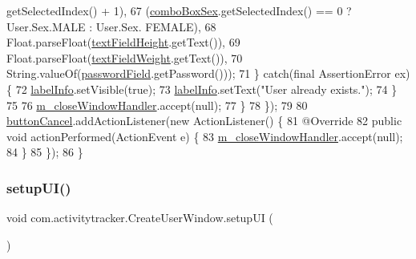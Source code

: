 \begin{DoxyCode}
      getSelectedIndex() + 1),
67                             (\mbox{\hyperlink{classcom_1_1activitytracker_1_1_create_user_window_a62e1c71627dc29c17bdffe73794f91f7}{comboBoxSex}}.getSelectedIndex() == 0 ? User.Sex.MALE : User.Sex.
      FEMALE),
68                             Float.parseFloat(\mbox{\hyperlink{classcom_1_1activitytracker_1_1_create_user_window_ac5ce2bc2efbc06d578d93fb3f26aad1c}{textFieldHeight}}.getText()),
69                             Float.parseFloat(\mbox{\hyperlink{classcom_1_1activitytracker_1_1_create_user_window_ae84b4d977150419bfabc11fbd009392c}{textFieldWeight}}.getText()),
70                             String.valueOf(\mbox{\hyperlink{classcom_1_1activitytracker_1_1_create_user_window_a29be9c267c003ae90731199d8257dc0a}{passwordField}}.getPassword()));
71                 \} \textcolor{keywordflow}{catch}(\textcolor{keyword}{final} AssertionError ex) \{
72                     \mbox{\hyperlink{classcom_1_1activitytracker_1_1_create_user_window_a09fb943f56852bc4a8dbd32b7dbe8afc}{labelInfo}}.setVisible(\textcolor{keyword}{true});
73                     \mbox{\hyperlink{classcom_1_1activitytracker_1_1_create_user_window_a09fb943f56852bc4a8dbd32b7dbe8afc}{labelInfo}}.setText(\textcolor{stringliteral}{"User already exists."});
74                 \}
75 
76                 \mbox{\hyperlink{classcom_1_1activitytracker_1_1_create_user_window_a8fd1d7fb3c2f1913d2c44fd1d475a20a}{m\_closeWindowHandler}}.accept(null);
77             \}
78         \});
79 
80         \mbox{\hyperlink{classcom_1_1activitytracker_1_1_create_user_window_a975a5cc35d145a3efa4d9e340776ca63}{buttonCancel}}.addActionListener(\textcolor{keyword}{new} ActionListener() \{
81             @Override
82             \textcolor{keyword}{public} \textcolor{keywordtype}{void} actionPerformed(ActionEvent e) \{
83                 \mbox{\hyperlink{classcom_1_1activitytracker_1_1_create_user_window_a8fd1d7fb3c2f1913d2c44fd1d475a20a}{m\_closeWindowHandler}}.accept(null);
84             \}
85         \});
86     \}
\end{DoxyCode}
\mbox{\label{classcom_1_1activitytracker_1_1_create_user_window_a41715d85194c6bb84cf6969f771940dc}} 
\subsubsection{\texorpdfstring{setup\+U\+I()}{setupUI()}}
{\footnotesize\ttfamily void com.\+activitytracker.\+Create\+User\+Window.\+setup\+UI (\begin{DoxyParamCaption}{ }\end{DoxyParamCaption})\hspace{0.3cm}{\ttfamily [private]}}



